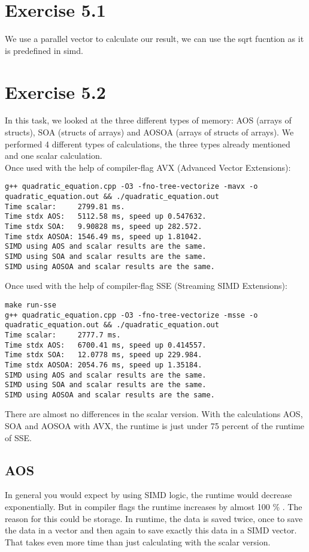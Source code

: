 \documentclass[a4paper]{article}
\begin{document}
\section*{Exercise 5.1}
We use a parallel vector to calculate our result, we can use the sqrt fucntion as it is predefined in simd.

\section*{Exercise 5.2}
In this task, we looked at the three different types of memory: AOS (arrays of structs), SOA (structs of arrays) and AOSOA (arrays of structs of arrays).
We performed 4 different types of calculations, the three types already mentioned and one scalar calculation. \\
Once used with the help of compiler-flag AVX (Advanced Vector Extensions):
\begin{lstlisting}
g++ quadratic_equation.cpp -O3 -fno-tree-vectorize -mavx -o quadratic_equation.out && ./quadratic_equation.out
Time scalar:     2799.81 ms.
Time stdx AOS:   5112.58 ms, speed up 0.547632.
Time stdx SOA:   9.90828 ms, speed up 282.572.
Time stdx AOSOA: 1546.49 ms, speed up 1.81042.
SIMD using AOS and scalar results are the same.
SIMD using SOA and scalar results are the same.
SIMD using AOSOA and scalar results are the same.
\end{lstlisting}

Once used with the help of compiler-flag SSE (Streaming SIMD Extensions):
\begin{lstlisting}
make run-sse
g++ quadratic_equation.cpp -O3 -fno-tree-vectorize -msse -o quadratic_equation.out && ./quadratic_equation.out
Time scalar:     2777.7 ms.
Time stdx AOS:   6700.41 ms, speed up 0.414557.
Time stdx SOA:   12.0778 ms, speed up 229.984.
Time stdx AOSOA: 2054.76 ms, speed up 1.35184.
SIMD using AOS and scalar results are the same.
SIMD using SOA and scalar results are the same.
SIMD using AOSOA and scalar results are the same.
\end{lstlisting}
There are almost no differences in the scalar version. 
With the calculations AOS, SOA and AOSOA with AVX, the runtime is just under 75 percent of the runtime of SSE.
\subsection*{AOS}
In general you would expect by using SIMD logic, the runtime would decrease exponentially. But in compiler flags the runtime increases by almost 100 \% .
The reason for this could be storage. In runtime, the data is saved twice, once to save the data in a vector and then again to save exactly this data in a SIMD vector. \\
That takes even more time than just calculating with the scalar version.
\end{document}
